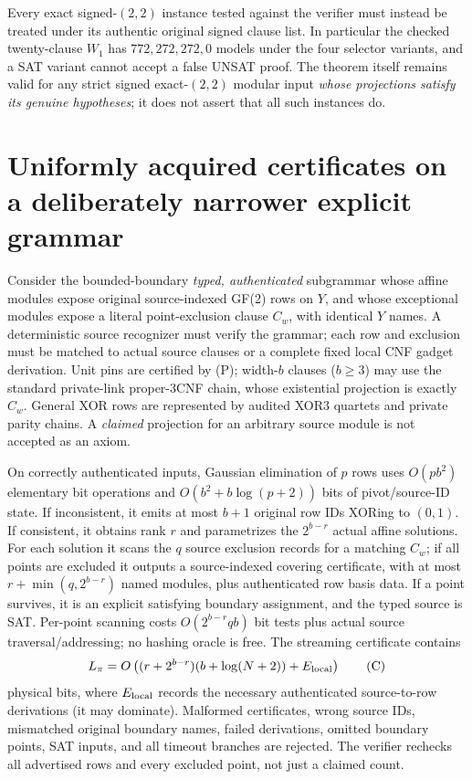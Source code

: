 \documentclass[11pt]{article}
\begin{document}
Every exact signed-$(2,2)$ instance tested against the verifier must instead be treated under its authentic original signed clause list. In particular the checked twenty-clause $W_1$ has $772,272,272,0$ models under the four selector variants, and a SAT variant cannot accept a false UNSAT proof. The theorem itself remains valid for any strict signed exact-$(2,2)$ modular input \emph{whose projections satisfy its genuine hypotheses}; it does not assert that all such instances do.

\section{Uniformly acquired certificates on a deliberately narrower explicit grammar}
Consider the bounded-boundary \emph{typed, authenticated} subgrammar whose affine modules expose original source-indexed GF(2) rows on $Y$, and whose exceptional modules expose a literal point-exclusion clause $C_w$, with identical $Y$ names. A deterministic source recognizer must verify the grammar; each row and exclusion must be matched to actual source clauses or a complete fixed local CNF gadget derivation. Unit pins are certified by (P); width-$b$ clauses ($b\ge3$) may use the standard private-link proper-3CNF chain, whose existential projection is exactly $C_w$. General XOR rows are represented by audited XOR3 quartets and private parity chains. A \emph{claimed} projection for an arbitrary source module is not accepted as an axiom.

On correctly authenticated inputs, Gaussian elimination of $p$ rows uses $O(pb^2)$ elementary bit operations and $O(b^2+b\log(p+2))$ bits of pivot/source-ID state. If inconsistent, it emits at most $b+1$ original row IDs XORing to $(0,1)$. If consistent, it obtains rank $r$ and parametrizes the $2^{b-r}$ actual affine solutions. For each solution it scans the $q$ source exclusion records for a matching $C_w$; if all points are excluded it outputs a source-indexed covering certificate, with at most $r+\min(q,2^{b-r})$ named modules, plus authenticated row basis data. If a point survives, it is an explicit satisfying boundary assignment, and the typed source is SAT. Per-point scanning costs $O(2^{b-r}qb)$ bit tests plus actual source traversal/addressing; no hashing oracle is free. The streaming certificate contains
\begin{equation}
L_\pi=O\left((r+2^{b-r})(b+\log(N+2))+E_{\rm local}\right) \tag{C}
\end{equation}
physical bits, where $E_{\rm local}$ records the necessary authenticated source-to-row derivations (it may dominate). Malformed certificates, wrong source IDs, mismatched original boundary names, failed derivations, omitted boundary points, SAT inputs, and all timeout branches are rejected. The verifier rechecks all advertised rows and every excluded point, not just a claimed count.
\end{document}
